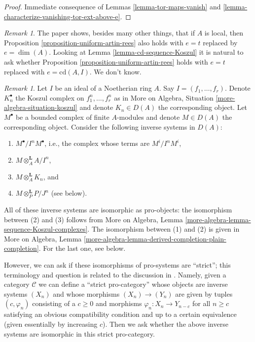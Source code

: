 \documentclass{stacks-project}
\theoremstyle{plain}
\theoremstyle{definition}
\theoremstyle{remark}
\newtheorem{remark}[subsection]{Remark}
\numberwithin{equation}{subsection}
\begin{document}
\begin{proof}
Immediate consequence of Lemmas
\ref{lemma-tor-maps-vanish} and
\ref{lemma-characterize-vanishing-tor-ext-above-e}.
\end{proof}

\begin{remark}
\label{remark-better-bound}
The paper \cite{AHS} shows, besides many other things, that if $A$ is local,
then Proposition \ref{proposition-uniform-artin-rees} also holds
with $e = t$ replaced by $e = \dim(A)$. Looking at
Lemma \ref{lemma-cd-sequence-Koszul} it is natural to ask whether
Proposition \ref{proposition-uniform-artin-rees}
holds with $e = t$ replaced with $e = \text{cd}(A, I)$. We don't know.
\end{remark}

\begin{remark}
\label{remark-strict-pro-isomorphism}
Let $I$ be an ideal of a Noetherian ring $A$. Say $I = (f_1, \ldots, f_r)$.
Denote $K_n^\bullet$ the Koszul complex on $f_1^n, \ldots, f_r^n$ as in
More on Algebra, Situation \ref{more-algebra-situation-koszul} and
denote $K_n \in D(A)$ the corresponding object.
Let $M^\bullet$ be a bounded complex of finite $A$-modules
and denote $M \in D(A)$ the corresponding object.
Consider the following inverse systems in $D(A)$:
\begin{enumerate}
\item $M^\bullet/I^nM^\bullet$, i.e., the complex whose terms are $M^i/I^nM^i$,
\item $M \otimes_A^\mathbf{L} A/I^n$,
\item $M \otimes_A^\mathbf{L} K_n$, and
\item $M \otimes_P^\mathbf{L} P/J^n$ (see below).
\end{enumerate}
All of these inverse systems are isomorphic as pro-objects:
the isomorphism between (2) and (3) follows from
More on Algebra, Lemma \ref{more-algebra-lemma-sequence-Koszul-complexes}.
The isomorphism between (1) and (2) is given in
More on Algebra, Lemma
\ref{more-algebra-lemma-derived-completion-plain-completion}.
For the last one, see below.

\medskip\noindent
However, we can ask if these isomorphisms of pro-systems are ``strict'';
this terminology and question is related to the discussion in
\cite[pages 61, 62]{quillenhomology}. Namely, given a category $\mathcal{C}$
we can define a ``strict pro-category'' whose objects are inverse systems
$(X_n)$ and whose morphisms $(X_n) \to (Y_n)$ are given by tuples
$(c, \varphi_n)$ consisting of a $c \geq 0$ and morphisms
$\varphi_n : X_n \to Y_{n - c}$ for all $n \geq c$ satisfying
an obvious compatibility condition and up to a certain equivalence
(given essentially by increasing $c$). Then we ask whether the above
inverse systems are isomorphic in this strict pro-category.


\end{remark}
\end{document}
